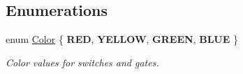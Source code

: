 \subsection*{Enumerations}
\begin{DoxyCompactItemize}
\item 
\hypertarget{namespaceboxedin_a5d4a85861c29b50e230046a0e9c2cd73}{enum \hyperlink{namespaceboxedin_a5d4a85861c29b50e230046a0e9c2cd73}{Color} \{ {\bfseries R\+E\+D}, 
{\bfseries Y\+E\+L\+L\+O\+W}, 
{\bfseries G\+R\+E\+E\+N}, 
{\bfseries B\+L\+U\+E}
 \}}\label{namespaceboxedin_a5d4a85861c29b50e230046a0e9c2cd73}

\begin{DoxyCompactList}\small\item\em Color values for switches and gates. \end{DoxyCompactList}\end{DoxyCompactItemize}
